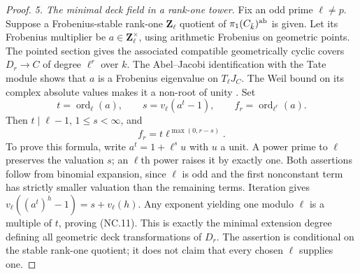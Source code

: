 \begin{proof}
\emph{5. The minimal deck field in a rank-one tower.}
Fix an odd prime $\ell\ne p$. Suppose a Frobenius-stable
rank-one $\mathbf Z_\ell$ quotient of
$\pi_1(C_{\bar k})^{\rm ab}$ is given. Let its Frobenius
multiplier be $a\in\mathbf Z_\ell^\times$, using arithmetic
Frobenius on geometric points. The pointed section gives
the associated compatible geometrically cyclic covers
$D_r\to C$ of degree $\ell^r$ over $k$.
The Abel--Jacobi identification with the Tate module
\cite[Proposition~9.1]{MilneJV}
\cite[Remark~15.3]{MilneAV}
shows that $a$ is a Frobenius eigenvalue on $T_\ell J_C$.
The Weil bound on its complex absolute values makes it
a non-root of unity \cite[Theorem~19.1]{MilneAV}.
Set
\[
 t=\operatorname{ord}_{\ell}(a),\qquad
 s=v_\ell(a^t-1),\qquad
 f_r=\operatorname{ord}_{\ell^r}(a).
       \tag{NC.10}
\]
Then $t\mid\ell-1$, $1\le s<\infty$, and
\[
                         f_r=t\ell^{\max(0,r-s)}.
       \tag{NC.11}
\]
To prove this formula, write $a^t=1+\ell^s u$ with $u$ a
unit. A power prime to $\ell$ preserves the valuation $s$;
an $\ell$th power raises it by exactly one. Both assertions
follow from binomial expansion, since $\ell$ is odd and
the first nonconstant term has strictly smaller valuation
than the remaining terms. Iteration gives
$v_\ell((a^t)^h-1)=s+v_\ell(h)$.
Any exponent yielding one modulo $\ell$ is a multiple of
$t$, proving (NC.11). This is exactly the minimal extension
degree defining all geometric deck transformations of $D_r$.
The assertion is conditional on the stable rank-one quotient;
it does not claim that every chosen $\ell$ supplies one.


\end{proof}
